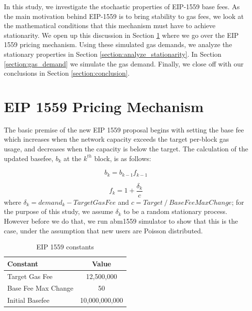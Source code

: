 \documentclass[peerreview]{ieeesyscoin}
\begin{document}
In this study, we investigate the stochastic properties of EIP-1559 base fees. As the main motivation behind EIP-1559 is to bring stability to gas fees, we look at the mathematical conditions that this mechanism must have to achieve stationarity. We open up this discussion in Section \ref{section:eip_1559} where we go over the EIP 1559 pricing mechanism. Using these simulated gas demands, we analyze the stationary properties in Section \ref{section:analyze_stationarity}. In Section \ref{section:gas_demand} we simulate the gas demand.  Finally, we close off with our conclusions in Section \ref{section:conclusion}.

\section{EIP 1559 Pricing Mechanism}
\label{section:eip_1559}

The basic premise of the new EIP 1559 proposal begins with setting the base fee which increases when the network capacity exceeds the target per-block gas usage, and decreases when the capacity is below the target. The calculation of the updated basefee, $b_{k}$ at the $k^{th}$ block, is as follows:

\begin{equation}
b_{k} = b_{k-1}f_{k-1}
\label{eq:eip1559} \tag{1}
\end{equation}

\begin{equation}
f_{k} = 1 + \frac{\delta_{k}}{c}
\label{eq:fk} \tag{2}
\end{equation}
where $\delta_{k} = demand_{k} - Target Gas Fee$ and $c = Target ~/~ BaseFee Max Change$; for the purpose of this study, we assume $\delta_{k}$ to be a random stationary process. However before we do that, we run abm1559 simulator to show that this is the case, under the assumption that new users are Poisson distributed.


\begin{table}[h!]
\centering
\begin{tabular}{ |l|c| } 
\hline
 Constant & Value \\
\hline
Target Gas Fee & 12,500,000 \\
Base Fee Max Change & 50 \\
Initial Basefee & 10,000,000,000\\

\hline
\end{tabular}
\caption{EIP 1559 constants}
\label{table:pow_vs_pos}
\end{table}
\end{document}
